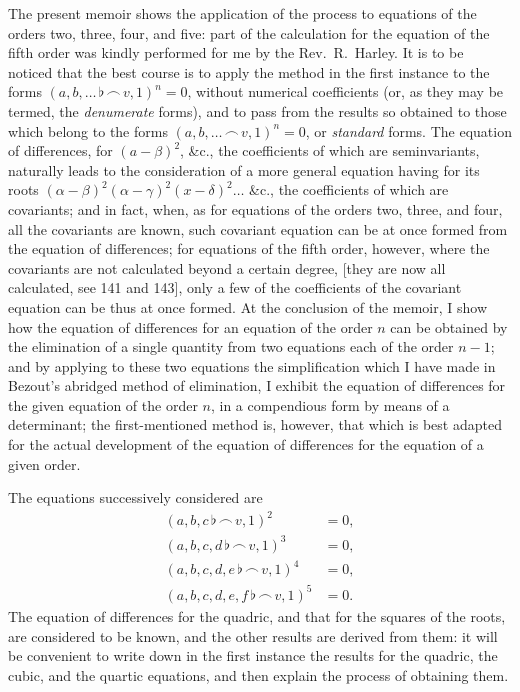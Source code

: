 \documentclass[11pt,a4paper]{article}
\theoremstyle{definition}
\begin{document}
The present memoir shows the application of the process to equations of the orders two, three, four, and five: part of the calculation for the equation of the fifth order was kindly performed for me by the Rev.~R.~Harley. It is to be noticed that the best course is to apply the method in the first instance to the forms $(a,b,\ldots\,\flat\,\frown\, v,1)^n=0$, without numerical coefficients (or, as they may be termed, the \textit{denumerate} forms), and to pass from the results so obtained to those which belong to the forms $(a,b,\ldots\,\frown\, v,1)^n=0$, or \textit{standard} forms. The equation of differences, for $(a-\beta)^2$, \&c., the coefficients of which are seminvariants, naturally leads to the consideration of a more general equation having for its roots $(\alpha-\beta)^2(\alpha-\gamma)^2(x-\delta)^2\ldots$ \&c., the coefficients of which are covariants; and in fact, when, as for equations of the orders two, three, and four, all the covariants are known, such covariant equation can be at once formed from the equation of differences; for equations of the fifth order, however, where the covariants are not calculated beyond a certain degree, [they are now all calculated, see 141 and 143], only a few of the coefficients of the covariant equation can be thus at once formed. At the conclusion of the memoir, I show how the equation of differences for an equation of the order $n$ can be obtained by the elimination of a single quantity from two equations each of the order $n-1$; and by applying to these two equations the simplification which I have made in Bezout's abridged method of elimination, I exhibit the equation of differences for the given equation of the order $n$, in a compendious form by means of a determinant; the first-mentioned method is, however, that which is best adapted for the actual development of the equation of differences for the equation of a given order.

\vspace{6pt}

The equations successively considered are
\begin{align*}
(a,b,c\,\flat\,\frown\, v,1)^2 &= 0,\\
(a,b,c,d\,\flat\,\frown\, v,1)^3 &= 0,\\
(a,b,c,d,e\,\flat\,\frown\, v,1)^4 &= 0,\\
(a,b,c,d,e,f\,\flat\,\frown\, v,1)^5 &= 0.
\end{align*}
The equation of differences for the quadric, and that for the squares of the roots, are considered to be known, and the other results are derived from them: it will be convenient to write down in the first instance the results for the quadric, the cubic, and the quartic equations, and then explain the process of obtaining them.
\end{document}
